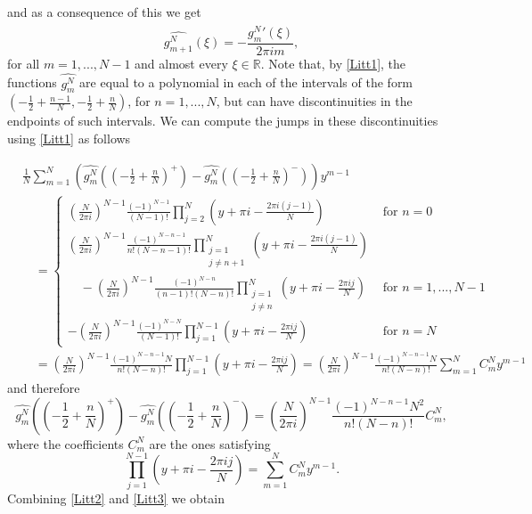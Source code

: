 \documentclass[reqno]{amsart}
\theoremstyle{plain}
\theoremstyle{definition}
\numberwithin{equation}{section}
\newcommand{\R}{{\mathbb R}}
\newcommand{\pa}[1]{\left(#1\right)}
\begin{document}
and as a consequence of this we get
\begin{equation}\label{Litt2}
	\widehat{g^N_{m+1}}(\xi)=-\frac{\widehat{g^N_m}'(\xi)}{2\pi i m},
\end{equation}
for all $m=1,...,N-1$ and almost every $\xi\in\R$. Note that, by \eqref{Litt1}, the functions $\widehat{g^N_m}$ are equal to a polynomial in each of the intervals of the form $\pa{-\frac{1}{2}+\frac{n-1}{N},-\frac{1}{2}+\frac{n}{N}}$, for $n=1,...,N$, but can have discontinuities in the endpoints of such intervals. We can compute the jumps in these discontinuities using \eqref{Litt1} as follows

\begin{align*}
	& \frac{1}{N}\sum_{m=1}^N 
	\pa{\widehat{g^N_m}\pa{\pa{-\frac{1}{2}+\frac{n}{N}}^+}-\widehat{g^N_m}\pa{\pa{-\frac{1}{2}+\frac{n}{N}}^-}} y^{m-1} \\
	& \quad =
	\begin{cases}
		\displaystyle \pa{\frac{N}{2\pi i}}^{N-1} \frac{(-1)^{N-1}}{(N-1)!} 
		\prod_{j=2}^N \pa{y+\pi i-\frac{2\pi i (j-1)}{N}} & \text{ for } n=0 \\
		\displaystyle \pa{\frac{N}{2\pi i}}^{N-1} \frac{(-1)^{N-n-1}}{n!(N-n-1)!}
		\prod_{\substack{j=1 \\ j\neq n+1}}^N \pa{y+\pi i-\frac{2\pi i(j-1)}{N}} \\
		\quad \displaystyle - \pa{\frac{N}{2\pi i}}^{N-1} \frac{(-1)^{N-n}}{(n-1)!(N-n)!}
		\prod_{\substack{j=1 \\ j\neq n}}^N \pa{y+\pi i-\frac{2\pi i j}{N}} & \text{ for } n=1,...,N-1 \\
		\displaystyle -\pa{\frac{N}{2\pi i}}^{N-1} \frac{(-1)^{N-N}}{(N-1)!} 
		\prod_{j=1}^{N-1} \pa{y+\pi i-\frac{2\pi i j}{N}} & \text{ for } n=N
	\end{cases} \\
	& \quad = \pa{\frac{N}{2\pi i}}^{N-1} \frac{(-1)^{N-n-1} N}{n!(N-n)!} \prod_{j=1}^{N-1} \pa{y+\pi i-\frac{2\pi i j}{N}}
	= \pa{\frac{N}{2\pi i}}^{N-1} \frac{(-1)^{N-n-1} N}{n!(N-n)!} \sum_{m=1}^N C^N_m y^{m-1}
\end{align*}
and therefore
\begin{equation}\label{Litt3}
	\widehat{g^N_m}\pa{\pa{-\frac{1}{2}+\frac{n}{N}}^+}-\widehat{g^N_m}\pa{\pa{-\frac{1}{2}+\frac{n}{N}}^-}
	= \pa{\frac{N}{2\pi i}}^{N-1} \frac{(-1)^{N-n-1} N^2}{n!(N-n)!} C^N_m,
\end{equation}
where the coefficients $C^N_m$ are the ones satisfying
$$\prod_{j=1}^{N-1} \pa{y+\pi i-\frac{2\pi i j}{N}}=\sum_{m=1}^N C^N_m y^{m-1}.$$
Combining \eqref{Litt2} and \eqref{Litt3} we obtain
\end{document}
